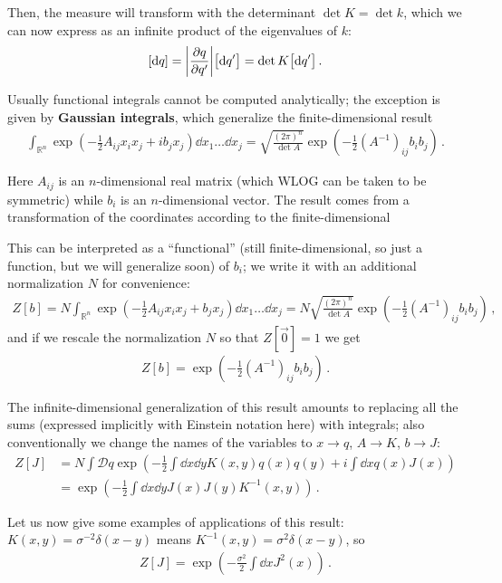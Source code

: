 \documentclass[main.tex]{subfiles}
\begin{document}
Then, the measure will transform with the determinant \(\det K = \det k\), which we can now express as an infinite product of the eigenvalues of \(k\): 
%
\begin{align}
\qty[ \dd{q}] = \abs{\pdv{q}{q'}} \qty[ \dd{q'}] = \det K \qty[ \dd{q'}]
\,.
\end{align}

Usually functional integrals cannot be computed analytically; the exception is given by \textbf{Gaussian integrals}, which generalize the finite-dimensional result 
%
\begin{align}
\int_{\mathbb{R}^{n}} \exp(- \frac{1}{2} A_{ij} x_i x_j + i b_j x_j) \dd{x_1 } \dots \dd{x_j} = \sqrt{\frac{(2 \pi)^{n}}{\det A}}
\exp(- \frac{1}{2} (A^{-1})_{ij} b_i b_j)
\,.
\end{align}

Here \(A_{ij}\) is an \(n\)-dimensional real matrix (which WLOG can be taken to be symmetric) while \(b_i\) is an \(n\)-dimensional vector.
The result comes from a transformation of the coordinates according to the finite-dimensional 

This can be interpreted as a ``functional'' (still finite-dimensional, so just a function, but we will generalize soon) of \(b_i\); we write it with an additional normalization \(N\) for convenience:
%
\begin{align}
Z[b] = N \int _{\mathbb{R}^{n}} \exp(- \frac{1}{2} A_{ij} x_i x_j + b_j x_j) \dd{x_1 } \dots \dd{x_j}
= N \sqrt{\frac{(2 \pi )^{n}}{\det A}} \exp(- \frac{1}{2} (A^{-1})_{ij}b_i b_j)
\,,
\end{align}
%
and if we rescale the normalization \(N\) so that \(Z[\vec{0}] = 1 \) we get 
%
\begin{align}
Z[b] = \exp(- \frac{1}{2} (A^{-1})_{ij}b_i b_j)
\,.
\end{align}

The infinite-dimensional generalization of this result amounts to replacing all the sums (expressed implicitly with Einstein notation here) with integrals; also conventionally we change the names of the variables to \(x \to q\), \(A \to K\), \(b \to J\): 
%
\begin{align} \label{eq:gaussian-integral}
Z[J] &= N \int \mathcal{D}q \exp(- \frac{1}{2} \int \dd{x} \dd{y} K(x, y) q(x) q(y) + i \int \dd{x} q(x) J(x))  \\
&= \exp(- \frac{1}{2} \int \dd{x} \dd{y} J(x) J(y) K^{-1}(x, y))
\,.
\end{align}

Let us now give some examples of applications of this result: \(K(x,y) = \sigma^{-2} \delta (x-y)\) means \(K^{-1}(x,y) = \sigma^2 \delta (x-y) \), so 
%
\begin{align}
Z[J] = \exp(- \frac{\sigma^2}{2} \int \dd{x} J^2(x))
\,.
\end{align}
\end{document}
